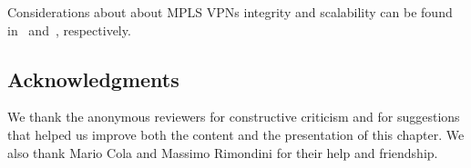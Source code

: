\documentclass{article}
\begin{document}
Considerations about about MPLS VPNs integrity and scalability can be found in~\cite{integrity} and~\cite{juniper-preso,rfc5439}, respectively.


\subsection*{Acknowledgments}

We thank the anonymous reviewers for constructive criticism and for suggestions 
that helped us improve both the content and the presentation of this chapter. We 
also thank Mario Cola and Massimo Rimondini for their help and 
friendship.




\end{document}

